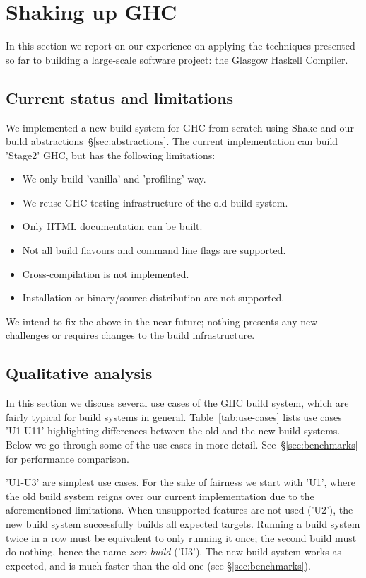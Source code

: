 \section{Shaking up GHC\label{sec:ghc}}

In this section we report on our experience on applying the techniques presented
so far to building a large-scale software project: the Glasgow Haskell Compiler.

\subsection{Current status and limitations\label{sec:limitations}}

We implemented a new build system for GHC from scratch using Shake and our build
abstractions~\S\ref{sec:abstractions}. The current implementation can build
\lst'Stage2' GHC, but has the following limitations:
\begin{itemize}
  \item We only build \lst'vanilla' and \lst'profiling' way.
  \item We reuse GHC testing infrastructure of the old build system.
  \item Only HTML documentation can be built.
  \item Not all build flavours and command line flags are supported.
  \item Cross-compilation is not implemented.
  \item Installation or binary/source distribution are not supported.
\end{itemize}

\noindent We intend to fix the above in the near future; nothing presents any
new challenges or requires changes to the build infrastructure.

\subsection{Qualitative analysis\label{sec:use-cases}}

In this section we discuss several use cases of the GHC build system, which
are fairly typical for build systems in general. Table~\ref{tab:use-cases}
lists use cases \lst'U1-U11' highlighting differences between the old and the
new build systems. Below we go through some of the use cases in more detail.
See~\S\ref{sec:benchmarks} for performance comparison.

\lst'U1-U3' are simplest use cases. For the sake of fairness we start with
\lst'U1', where the old build system reigns over our current implementation due
to the aforementioned limitations. When unsupported features are not used
(\lst'U2'), the new build system successfully builds all expected targets.
Running a build system twice in a row must be equivalent to only running it
once; the second build must do nothing, hence the name \emph{zero
build} (\lst'U3'). The new build system works as expected, and is much faster
than the old one (see \S\ref{sec:benchmarks}).

